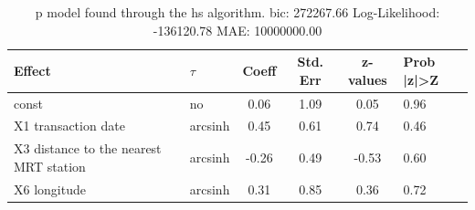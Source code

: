 \begin{table}
	\caption{p model found through the hs algorithm. bic: 272267.66 Log-Likelihood: -136120.78 MAE: 10000000.00}
	\begin{center}
		\begin{tabular}{|l|l|c|c|c|l|}
			\hline
			Effect & $\tau$ & Coeff & Std. Err & z-values & Prob |z|>Z \\
			\hline
			const & no & 0.06 & 1.09 & 0.05 & 0.96 \\
			\hline
			X1 transaction date & arcsinh & 0.45 & 0.61 & 0.74 & 0.46 \\
			\hline
			X3 distance to the nearest MRT station & arcsinh & -0.26 & 0.49 & -0.53 & 0.60 \\
			\hline
			X6 longitude & arcsinh & 0.31 & 0.85 & 0.36 & 0.72 \\
			\hline
		\end{tabular}
	\end{center}
\end{table}